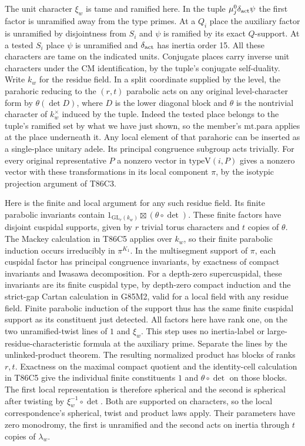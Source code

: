 The unit character $\xi_w$ is tame and ramified here. In the
tuple $\mu_j^0\delta_{\rm act}\psi$ the first factor is
unramified away from the type primes. At a $Q_i$ place the
auxiliary factor is unramified by disjointness from $S_i$ and
$\psi$ is ramified by its exact $Q$-support. At a tested $S_i$
place $\psi$ is unramified and $\delta_{\rm act}$ has inertia
order 15. All these characters are tame on the indicated
units. Conjugate places carry inverse unit characters under
the CM identification, by the tuple's conjugate self-duality.
Write $k_w$ for the residue field. In a split coordinate supplied
by the level, the parahoric reducing to the $(r,t)$ parabolic
acts on any original level-character form by
$\theta(\det D)$, where $D$ is the lower diagonal block and
$\theta$ is the nontrivial character of $k_w^\times$ induced by
the tuple. Indeed the tested place belongs to the tuple's ramified
set by what we have just shown, so the member's $\mathrm{mt.para}$
applies at the place underneath it. Any local element of that
parahoric can be inserted as a single-place unitary adele. Its
principal congruence subgroup acts trivially. For every original
representative $P$ a nonzero vector in $\mathrm{typeV}(i,P)$
gives a nonzero vector with these transformations in its local
component $\pi$, by the isotypic projection argument of T86C3.

Here is the finite and local argument for any such residue field.
Its finite parabolic invariants contain
$1_{\mathrm{GL}_r(k_w)}\boxtimes(\theta\circ\det)$.
These finite factors have disjoint cuspidal supports, given by
$r$ trivial torus characters and $t$ copies of $\theta$.
The Mackey calculation in T86C5 applies over $k_w$, so their
finite parabolic induction occurs irreducibly in $\pi^{K_1}$.
In the multisegment support of $\pi$, each cuspidal factor has
principal congruence invariants, by exactness of compact
invariants and Iwasawa decomposition. For a depth-zero
supercuspidal, these invariants are its finite cuspidal type,
by depth-zero compact induction and the strict-gap Cartan
calculation in G85M2, valid for a local field with any residue
field. Finite parabolic induction of the support thus has the
same finite cuspidal support as its constituent just detected.
All factors here have rank one, on the two unramified-twist
lines of $1$ and $\xi_w$. This step uses no inertia-label or
large-residue-characteristic formula at the auxiliary prime.
Separate the lines by the unlinked-product theorem. The resulting
normalized product has blocks of ranks $r,t$. Exactness on the
maximal compact quotient and the identity-cell calculation in
T86C5 give the individual finite constituents $1$ and
$\theta\circ\det$ on those blocks. The first local representation
is therefore spherical and the second is spherical after twisting
by $\xi_w^{-1}\circ\det$. Both are supported on characters, so
the local correspondence's spherical, twist and product laws apply.
Their parameters have zero monodromy, the first is unramified
and the second acts on inertia through $t$ copies of $\lambda_w$.

